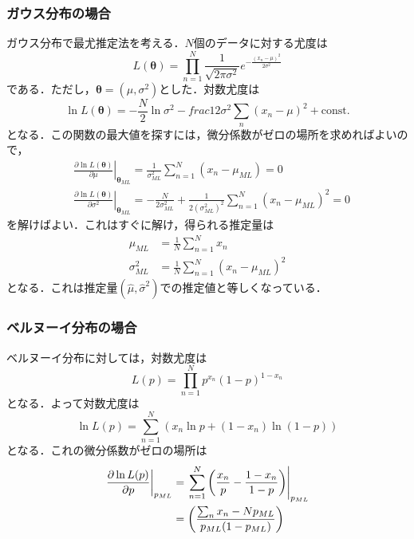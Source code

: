 \documentclass[a4paper,11pt]{jsreport}
\begin{document}
\subsubsection{ガウス分布の場合}
ガウス分布で最尤推定法を考える．$N$個のデータに対する尤度は
\begin{equation}
  L(\bm{\theta})
  = \prod_{n=1}^N \frac{1}{\sqrt{2 \pi \sigma^2}} e^{-\frac{(x_n - \mu)^2}{2 \sigma^2}}
\end{equation}
である．ただし，$\bm{\theta} = (\mu, \sigma^2)$とした．対数尤度は
\begin{equation}
  \ln{L(\bm{\theta})}
  = -\frac{N}{2} \ln{\sigma^2} - frac{1}{2\sigma^2} \sum_{n} (x_n - \mu)^2 + \text{const.}
\end{equation}
となる．この関数の最大値を探すには，微分係数がゼロの場所を求めればよいので，
\begin{align}
& \left.\frac{\partial \ln L(\bm{\theta})}{\partial \mu}\right|_{\bm{\theta}_{ML}}
= \frac{1}{\sigma_{M L}^2} \sum_{n=1}^N\left(x_n-\mu_{M L}\right) = 0 \\
& \left.\frac{\partial \ln L(\bm{\theta})}{\partial \sigma^2}\right|_{\bm{\theta}_{ML}}
= -\frac{N}{2 \sigma_{M L}^2}+\frac{1}{2\left(\sigma_{M L}^2\right)^2} \sum_{n=1}^N\left(x_n-\mu_{M L}\right)^2 = 0
\end{align}
を解けばよい．これはすぐに解け，得られる推定量は
\begin{align}
  \mu_{ML}
  &= \frac{1}{N} \sum_{n=1}^{N} x_n \\
  \sigma_{ML}^2
  &= \frac{1}{N} \sum_{n=1}^{N} (x_n - \mu_{ML})^2
\end{align}
となる．これは推定量$(\hat{\mu}, \hat{\sigma}^2)$での推定値と等しくなっている．

\subsubsection{ベルヌーイ分布の場合}
ベルヌーイ分布に対しては，対数尤度は
\begin{equation}
  L(p) = \prod_{n=1}^{N} p^{x_n} (1 - p)^{1 - x_n}
\end{equation}
となる．よって対数尤度は
\begin{equation}
  \ln{L(p)} = \sum_{n=1}^{N} (x_n \ln{p} + (1 - x_n)\ln{(1 - p)})
\end{equation}
となる．これの微分係数がゼロの場所は
\begin{align}
  \left.\frac{\partial \ln{L(p)}}{\partial p}\right|_{p_{ML}}
  &= \left.\sum_{n=1}^{N} \left(\frac{x_n}{p} - \frac{1 - x_n}{1 - p}\right) \right|_{p_{ML}} \notag \\
  &= \left(\frac{\sum_n x_n - N p_{ML}}{p_{ML}(1-p_{ML})}\right)
\end{align}
\end{document}
